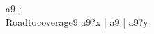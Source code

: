 \begin{circus}
\circchannel a9 : \nat \\
\circprocess Roadtocoverage9 \circdef \circbegin
	\circspot
	    a9?x \then \Skip \lpar | \lchanset a9 \rchanset | \rpar a9?y \then \Skip
	    \\
	\circend
\end{circus}

